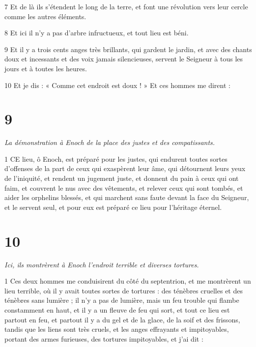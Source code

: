 \par 7 Et de là ils s'étendent le long de la terre, et font une révolution vers leur cercle comme les autres éléments.

\par 8 Et ici il n'y a pas d'arbre infructueux, et tout lieu est béni.

\par 9 Et il y a trois cents anges très brillants, qui gardent le jardin, et avec des chants doux et incessants et des voix jamais silencieuses, servent le Seigneur à tous les jours et à toutes les heures.

\par 10 Et je dis : « Comme cet endroit est doux ! » Et ces hommes me dirent :

\chapter{9}

\par \textit{La démonstration à Enoch de la place des justes et des compatissants.}

\par 1 CE lieu, ô Enoch, est préparé pour les justes, qui endurent toutes sortes d'offenses de la part de ceux qui exaspèrent leur âme, qui détournent leurs yeux de l'iniquité, et rendent un jugement juste, et donnent du pain à ceux qui ont faim, et couvrent le nus avec des vêtements, et relever ceux qui sont tombés, et aider les orphelins blessés, et qui marchent sans faute devant la face du Seigneur, et le servent seul, et pour eux est préparé ce lieu pour l'héritage éternel.

\chapter{10}

\par \textit{Ici, ils montrèrent à Enoch l'endroit terrible et diverses tortures.}

\par 1 Ces deux hommes me conduisirent du côté du septentrion, et me montrèrent un lieu terrible, où il y avait toutes sortes de tortures : des ténèbres cruelles et des ténèbres sans lumière ; il n'y a pas de lumière, mais un feu trouble qui flambe constamment en haut, et il y a un fleuve de feu qui sort, et tout ce lieu est partout en feu, et partout il y a du gel et de la glace, de la soif et des frissons, tandis que les liens sont très cruels, et les anges effrayants et impitoyables, portant des armes furieuses, des tortures impitoyables, et j'ai dit :

